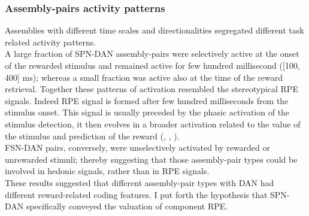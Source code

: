 \subsubsection{Assembly-pairs activity patterns}
Assemblies with different time scales and directionalities segregated different task related activity patterns.\\A large fraction of SPN-DAN assembly-pairs were selectively active at the onset of the rewarded stimulus and remained active for few hundred millisecond ([100, 400] ms); whereas a small fraction was active also at the time of the reward retrieval. Together these patterns of activation resembled the stereotypical RPE signals. Indeed RPE signal is formed after few hundred milliseconds from the stimulus onset. This signal is usually preceded by the phasic activation of the stimulus detection, it then evolves in a broader activation related to the value of the stimulus and prediction of the reward (\cite{Tobler2003}, \cite{Nomoto2010}, \cite{Schultz2016}).\\%
FSN-DAN pairs, conversely, were unselectively activated by rewarded or unrewarded stimuli; thereby suggesting that those assembly-pair types could be involved in hedonic signals, rather than in RPE signals.\\These results suggested that different assembly-pair types with DAN had different reward-related coding features. I put forth the hypothesis that SPN-DAN specifically conveyed the valuation of component RPE.

